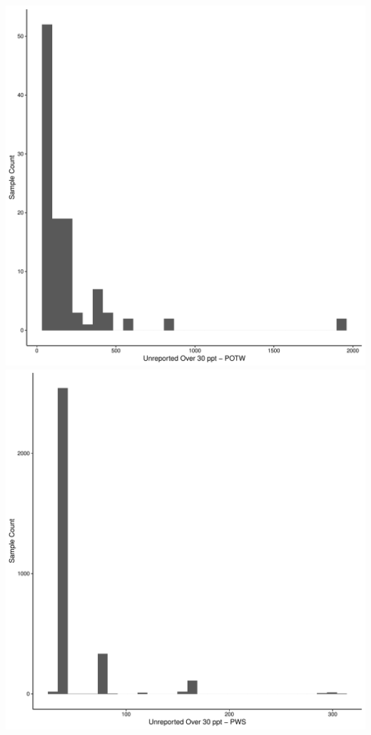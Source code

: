 \documentclass[
  12pt,
]{article}
\begin{document}
\includegraphics{PFAS_FinalProject_files/figure-latex/unnamed-chunk-26-1.pdf}
\includegraphics{PFAS_FinalProject_files/figure-latex/unnamed-chunk-27-1.pdf}
\end{document}
